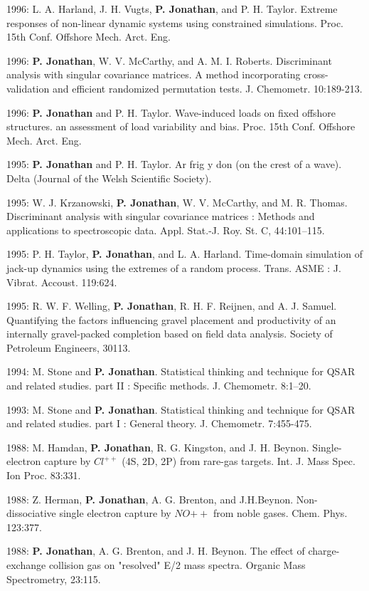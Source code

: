 \documentclass[11pt,a4paper]{moderncv}
\begin{document}
1996: L. A. Harland, J. H. Vugts, \textbf{P. Jonathan}, and P. H. Taylor. Extreme responses of non-linear dynamic systems using constrained simulations. Proc. 15th Conf. Offshore Mech. Arct. Eng.

1996: \textbf{P. Jonathan}, W. V. McCarthy, and A. M. I. Roberts. Discriminant analysis with singular covariance matrices. A method incorporating cross-validation and efficient randomized permutation tests. J. Chemometr. 10:189-213.

1996: \textbf{P. Jonathan} and P. H. Taylor. Wave-induced loads on fixed offshore structures. an assessment of load variability and bias. Proc. 15th Conf. Offshore Mech. Arct. Eng.

1995: \textbf{P. Jonathan} and P. H. Taylor. Ar frig y don (on the crest of a wave). Delta (Journal of the Welsh Scientific Society).

1995: W. J. Krzanowski, \textbf{P. Jonathan}, W. V. McCarthy, and M. R. Thomas. Discriminant analysis with singular covariance matrices : Methods and applications to spectroscopic data. Appl. Stat.-J. Roy. St. C, 44:101--115.

1995: P. H. Taylor, \textbf{P. Jonathan}, and L. A. Harland. Time-domain simulation of jack-up dynamics using the extremes of a random process. Trans. ASME : J. Vibrat. Accoust. 119:624.

1995: R. W. F. Welling, \textbf{P. Jonathan}, R. H. F. Reijnen, and A. J. Samuel. Quantifying the factors influencing gravel placement and productivity of an internally gravel-packed completion based on field data analysis. Society of Petroleum Engineers, 30113.

1994: M. Stone and \textbf{P. Jonathan}. Statistical thinking and technique for QSAR and related studies. part II : Specific methods. J. Chemometr. 8:1--20.

1993: M. Stone and \textbf{P. Jonathan}. Statistical thinking and technique for QSAR and related studies. part I : General theory. J. Chemometr. 7:455-475.

1988: M. Hamdan, \textbf{P. Jonathan}, R. G. Kingston, and J. H. Beynon. Single-electron capture by $Cl^{++}$ (4S, 2D, 2P) from rare-gas targets. Int. J. Mass Spec. Ion Proc. 83:331.

1988: Z. Herman, \textbf{P. Jonathan}, A. G. Brenton, and J.H.Beynon. Non-dissociative single electron capture by $NO{++}$ from noble gases. Chem. Phys. 123:377.

1988: \textbf{P. Jonathan}, A. G. Brenton, and J. H. Beynon. The effect of charge-exchange collision gas on "resolved" E/2 mass spectra. Organic Mass Spectrometry, 23:115.
\end{document}
